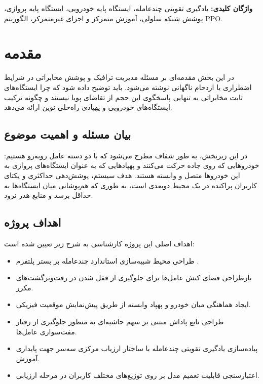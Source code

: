 \documentclass[a4paper,12pt,oneside]{report}
\begin{document}
\vspace{0.8cm}
\noindent \textbf{واژگان کليدی:} یادگیری تقویتی چندعامله، ایستگاه پایه خودرویی، ایستگاه پایه پروازی، پوشش شبکه سلولی، آموزش متمرکز و اجرای غیرمتمرکز، الگوریتم PPO.
\newpage

\tableofcontents
\newpage
\listoffigures
\newpage
\listoftables
\newpage

\printglossary[type=\acronymtype, title=مخفف‌ها]
\newpage

\setcounter{page}{1}

\chapter{مقدمه}
در این بخش مقدمه‌ای بر مسئله مدیریت ترافیک و پوشش مخابراتی در شرایط اضطراری یا ازدحام ناگهانی نوشته می‌شود. باید توضیح داده شود که چرا ایستگاه‌های ثابت مخابراتی به تنهایی پاسخگوی این حجم از تقاضای پویا نیستند و چگونه ترکیب ایستگاه‌های خودرویی و پهپادی راه‌حلی نوین ارائه می‌دهد.

\section{بیان مسئله و اهمیت موضوع}
در این زیربخش، به طور شفاف مطرح می‌شود که با دو دسته عامل روبه‌رو هستیم: خودروهایی که روی جاده حرکت می‌کنند و پهپادهایی که به عنوان ایستگاه‌های پروازی به این خودروها متصل و وابسته هستند. هدف سیستم، پوشش‌دهی حداکثری و یکتای کاربران پراکنده در یک محیط دوبعدی است، به طوری که هم‌پوشانی میان ایستگاه‌ها به حداقل برسد و منابع هدر نرود.

\section{اهداف پروژه}
اهداف اصلی این پروژه کارشناسی به شرح زیر تعیین شده است:
\begin{itemize}
    \item طراحی محیط شبیه‌سازی استاندارد چندعامله بر بستر پلتفرم .
    \item بازطراحی فضای کنش عامل‌ها برای جلوگیری از قفل شدن در رفت‌وبرگشت‌های مکرر.
    \item ایجاد هماهنگی میان خودرو و پهپاد وابسته از طریق پیش‌نمایش موقعیت فیزیکی.
    \item طراحی تابع پاداش مبتنی بر سهم حاشیه‌ای به منظور جلوگیری از رفتار مفت‌سواری عامل‌ها.
    \item پیاده‌سازی یادگیری تقویتی چندعامله با ساختار ارزیاب مرکزی سه‌سر جهت پایداری آموزش.
    \item اعتبارسنجی قابلیت تعمیم مدل بر روی توزیع‌های مختلف کاربران در مرحله ارزیابی.
\end{itemize}
\end{document}
